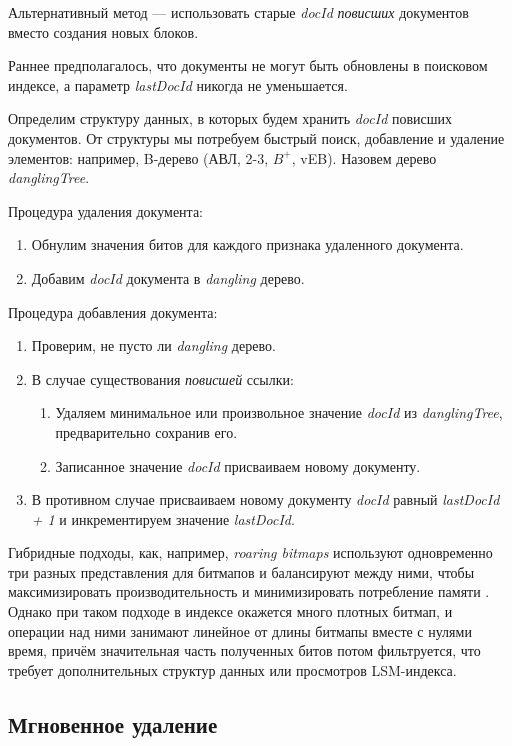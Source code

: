 Альтернативный метод — использовать старые \textit{docId} \textit{повисших}
документов вместо создания новых блоков.

Раннее предполагалось, что документы не могут быть обновлены в поисковом
индексе, а параметр \textit{lastDocId} никогда не уменьшается.

Определим структуру данных, в которых будем хранить \textit{docId} повисших
документов. От структуры мы потребуем быстрый поиск, добавление и удаление
элементов: например, B-дерево (АВЛ, 2-3, $B^{+}$, vEB).
Назовем дерево \textit{danglingTree}.

Процедура удаления документа:
\begin{enumerate}
    \item Обнулим значения битов для каждого признака удаленного документа.
    \item Добавим \textit{docId} документа в \textit{dangling} дерево.
\end{enumerate}

Процедура добавления документа:
\begin{enumerate}
    \item Проверим, не пусто ли \textit{dangling} дерево.
    \item В случае существования \textit{повисшей} ссылки:
    \begin{enumerate}
        \item Удаляем минимальное или произвольное значение \textit{docId} из
        \textit{danglingTree}, предварительно сохранив его.
        \item Записанное значение \textit{docId} присваиваем новому документу.
    \end{enumerate}
    \item В противном случае присваиваем новому документу \textit{docId} равный
    \textit{lastDocId + 1} и инкрементируем значение \textit{lastDocId}.
\end{enumerate}

Гибридные подходы, как, например, \textit{roaring bitmaps} используют одновременно
три разных представления для битмапов и балансируют между ними, чтобы
максимизировать производительность и минимизировать потребление памяти \cite{Roaring:2019}.
Однако при таком подходе в индексе окажется много плотных битмап, и операции над
ними занимают линейное от длины битмапы вместе с нулями время, причём значительная
часть полученных битов потом фильтруется, что требует дополнительных структур
данных или просмотров LSM-индекса.

\subsection{Мгновенное удаление}

